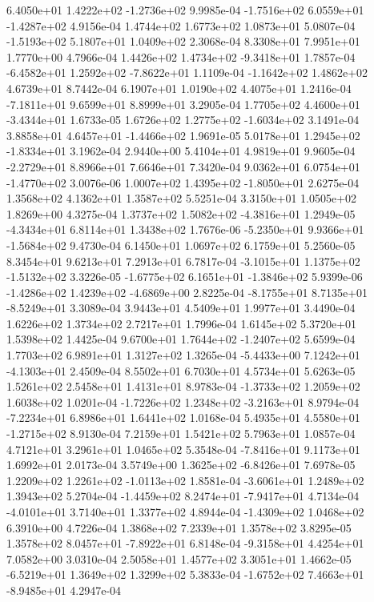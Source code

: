  6.4050e+01  1.4222e+02 -1.2736e+02  9.9985e-04
-1.7516e+02  6.0559e+01 -1.4287e+02  4.9156e-04
1.4744e+02 1.6773e+02 1.0873e+01  5.0807e-04
-1.5193e+02  5.1807e+01  1.0409e+02  2.3068e-04
8.3308e+01 7.9951e+01 1.7770e+00  4.7966e-04
 1.4426e+02  1.4734e+02 -9.3418e+01  1.7857e-04
-6.4582e+01  1.2592e+02 -7.8622e+01  1.1109e-04
-1.1642e+02  1.4862e+02  4.6739e+01  8.7442e-04
6.1907e+01 1.0190e+02 4.4075e+01  1.2416e-04
-7.1811e+01  9.6599e+01  8.8999e+01  3.2905e-04
 1.7705e+02  4.4600e+01 -3.4344e+01  1.6733e-05
 1.6726e+02  1.2775e+02 -1.6034e+02  3.1491e-04
 3.8858e+01  4.6457e+01 -1.4466e+02  1.9691e-05
 5.0178e+01  1.2945e+02 -1.8334e+01  3.1962e-04
2.9440e+00 5.4104e+01 4.9819e+01  9.9605e-04
-2.2729e+01  8.8966e+01  7.6646e+01  7.3420e-04
 9.0362e+01  6.0754e+01 -1.4770e+02  3.0076e-06
 1.0007e+02  1.4395e+02 -1.8050e+01  2.6275e-04
1.3568e+02 4.1362e+01 1.3587e+02  5.5251e-04
3.3150e+01 1.0505e+02 1.8269e+00  4.3275e-04
 1.3737e+02  1.5082e+02 -4.3816e+01  1.2949e-05
-4.3434e+01  6.8114e+01  1.3438e+02  1.7676e-06
-5.2350e+01  9.9366e+01 -1.5684e+02  9.4730e-04
6.1450e+01 1.0697e+02 6.1759e+01  5.2560e-05
8.3454e+01 9.6213e+01 7.2913e+01  6.7817e-04
-3.1015e+01  1.1375e+02 -1.5132e+02  3.3226e-05
-1.6775e+02  6.1651e+01 -1.3846e+02  5.9399e-06
-1.4286e+02  1.4239e+02 -4.6869e+00  2.8225e-04
-8.1755e+01  8.7135e+01 -8.5249e+01  3.3089e-04
3.9443e+01 4.5409e+01 1.9977e+01  3.4490e-04
1.6226e+02 1.3734e+02 2.7217e+01  1.7996e-04
1.6145e+02 5.3720e+01 1.5398e+02  1.4425e-04
 9.6700e+01  1.7644e+02 -1.2407e+02  5.6599e-04
1.7703e+02 6.9891e+01 1.3127e+02  1.3265e-04
-5.4433e+00  7.1242e+01 -4.1303e+01  2.4509e-04
8.5502e+01 6.7030e+01 4.5734e+01  5.6263e-05
1.5261e+02 2.5458e+01 1.4131e+01  8.9783e-04
-1.3733e+02  1.2059e+02  1.6038e+02  1.0201e-04
-1.7226e+02  1.2348e+02 -3.2163e+01  8.9794e-04
-7.2234e+01  6.8986e+01  1.6441e+02  1.0168e-04
 5.4935e+01  4.5580e+01 -1.2715e+02  8.9130e-04
7.2159e+01 1.5421e+02 5.7963e+01  1.0857e-04
4.7121e+01 3.2961e+01 1.0465e+02  5.3548e-04
-7.8416e+01  9.1173e+01  1.6992e+01  2.0173e-04
 3.5749e+00  1.3625e+02 -6.8426e+01  7.6978e-05
 1.2209e+02  1.2261e+02 -1.0113e+02  1.8581e-04
-3.6061e+01  1.2489e+02  1.3943e+02  5.2704e-04
-1.4459e+02  8.2474e+01 -7.9417e+01  4.7134e-04
-4.0101e+01  3.7140e+01  1.3377e+02  4.8944e-04
-1.4309e+02  1.0468e+02  6.3910e+00  4.7226e-04
1.3868e+02 7.2339e+01 1.3578e+02  3.8295e-05
 1.3578e+02  8.0457e+01 -7.8922e+01  6.8148e-04
-9.3158e+01  4.4254e+01  7.0582e+00  3.0310e-04
2.5058e+01 1.4577e+02 3.3051e+01  1.4662e-05
-6.5219e+01  1.3649e+02  1.3299e+02  5.3833e-04
-1.6752e+02  7.4663e+01 -8.9485e+01  4.2947e-04
